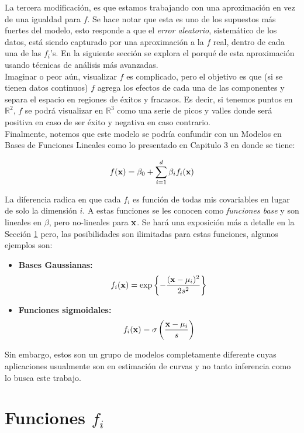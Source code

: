 \documentclass[../Main/Main.tex]{subfiles}
\begin{document}
La tercera modificación, es que estamos trabajando con una aproximación en vez de una igualdad para $f$. Se hace notar que esta es uno de los supuestos más fuertes del modelo, esto responde a que el \textit{error aleatorio}, sistemático de los datos, está siendo capturado por una aproximación a la $f$ real, dentro de cada una de las $f_i$'s. En la siguiente sección se explora el porqué de esta aproximación usando técnicas de análisis más avanzadas.\\

Imaginar o peor aún, visualizar $f$ es complicado, pero el objetivo es que (si se tienen datos continuos) $f$ agrega los efectos de cada una de las componentes y separa el espacio en regiones de éxitos y fracasos. Es decir, si tenemos puntos en $\mathbb{R}^2$, $f$ se podrá visualizar en $\mathbb{R}^3$ como una serie de picos y valles donde será positiva en caso de ser éxito y negativa en caso contrario.\\

Finalmente, notemos que este modelo se podría confundir con un Modelos en Bases de Funciones Lineales como lo presentado en Capitulo 3 en \autocite{bishop2006pattern} donde se tiene:

\begin{align} 
	f(\mathbf{x}) = \beta_0 + \sum_{i = 1}^d\beta_i f_i(\mathbf{x}) \label{ec:ExpansionBases1}
\end{align}

La diferencia radica en que cada $f_i$ es función de todas mis covariables en lugar de solo la dimensión $i$. A estas funciones se les conocen como \textit{funciones base} y son lineales en $\beta$, pero no-lineales para $\mathbf{x}$. Se hará una exposición más a detalle en la Sección \ref{sec:fj} pero, las posibilidades son ilimitadas para estas funciones, algunos ejemplos son:

\begin{itemize}
	\item \textbf{Bases Gaussianas:}
	 $$f_i(\mathbf{x}) = 
	 \exp\left\{-\dfrac{(\mathbf{x} - \mu_i)^2}{2s^2}\right\}$$
	\item \textbf{Funciones sigmoidales:} 
	$$f_i(\mathbf{x}) = 
	\sigma\left( \dfrac{\mathbf{x} - \mu_i}{s} \right)$$
\end{itemize}

Sin embargo, estos son un grupo de modelos completamente diferente cuyas aplicaciones usualmente son en estimación de curvas y no tanto inferencia como lo busca este trabajo.

\section{Funciones $f_i$} \label{sec:fj}
\end{document}
